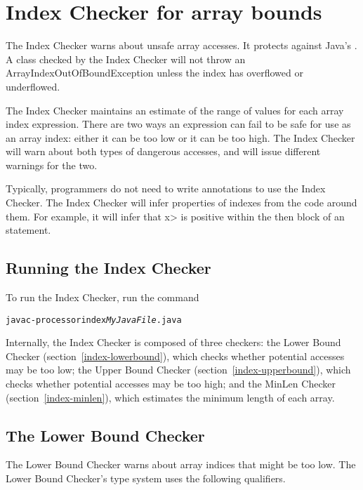\chapter{Index Checker for array bounds\label{index-checker}}

The Index Checker warns about unsafe array accesses.  It protects
against Java's
. A
class checked by the
Index Checker  will not throw an ArrayIndexOutOfBoundException unless the
index has overflowed or underflowed.

The Index Checker maintains an estimate of the range of values for each array
index expression.  There are two ways an expression can fail to be safe for use as an
array index: either it can be too low or it can be too high. The Index
Checker will warn about both types of dangerous accesses, and will
issue different warnings for the two.

Typically, programmers do not need to write annotations to use the
Index Checker. The Index Checker will infer properties of indexes from
the code around them.  For example, it will infer that \<x> is positive
within the then block of an  statement.


\section{Running the Index Checker\label{index-running}}

To run the Index Checker, run the command

\begin{alltt}
  javac -processor index \emph{MyJavaFile}.java
\end{alltt}

Internally, the Index Checker is composed of three checkers: the Lower
Bound Checker (section~\ref{index-lowerbound}), which checks whether potential accesses may be too low;
the Upper Bound Checker (section~\ref{index-upperbound}), which checks whether potential accesses
may be too high; and the MinLen Checker (section~\ref{index-minlen}), which estimates the minimum
length of each array.


\section{The Lower Bound Checker\label{index-lowerbound}}

The Lower Bound Checker warns about array indices that might be
too low.  The
Lower Bound Checker's type system uses the following qualifiers.

